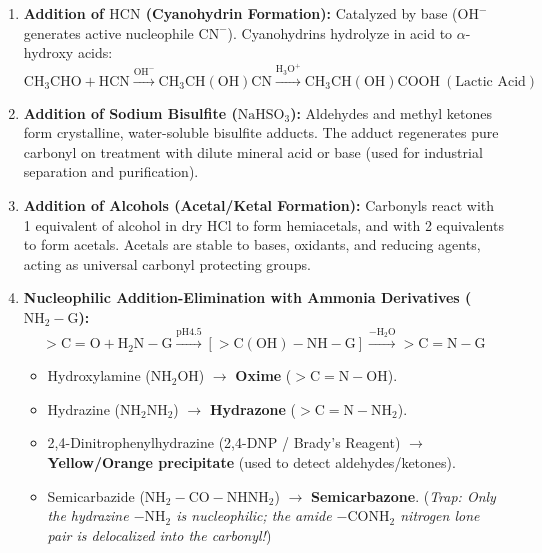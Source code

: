 \documentclass[10pt,a4paper]{article}
\begin{document}
\begin{usecasebox}
\begin{enumerate}[leftmargin=*]
  \item \textbf{Addition of $\mathrm{HCN}$ (Cyanohydrin Formation):} Catalyzed by base ($\mathrm{OH^-}$ generates active nucleophile $\mathrm{CN^-}$). Cyanohydrins hydrolyze in acid to $\alpha$-hydroxy acids:
  \begin{equation}
    \mathrm{CH_3CHO} + \mathrm{HCN} \xrightarrow{\mathrm{OH^-}} \mathrm{CH_3CH(OH)CN} \xrightarrow{\mathrm{H_3O^+}} \mathrm{CH_3CH(OH)COOH} \ (\text{Lactic Acid})
  \end{equation}
  \item \textbf{Addition of Sodium Bisulfite ($\mathrm{NaHSO_3}$):} Aldehydes and methyl ketones form crystalline, water-soluble bisulfite adducts. The adduct regenerates pure carbonyl on treatment with dilute mineral acid or base (used for industrial separation and purification).
  \item \textbf{Addition of Alcohols (Acetal/Ketal Formation):} Carbonyls react with 1 equivalent of alcohol in dry $\mathrm{HCl}$ to form hemiacetals, and with 2 equivalents to form acetals. Acetals are stable to bases, oxidants, and reducing agents, acting as universal carbonyl protecting groups.
  \item \textbf{Nucleophilic Addition-Elimination with Ammonia Derivatives ($\mathrm{NH_2-G}$):}
  \begin{equation}
    >\mathrm{C=O} + \mathrm{H_2N-G} \xrightarrow{\mathrm{pH } 4.5} [>\mathrm{C(OH)-NH-G}] \xrightarrow{-\mathrm{H_2O}} >\mathbf{\mathrm{C=N-G}}
  \end{equation}
  \begin{itemize}
    \item Hydroxylamine ($\mathrm{NH_2OH}$) $\to$ \textbf{Oxime} ($>\mathrm{C=N-OH}$).
    \item Hydrazine ($\mathrm{NH_2NH_2}$) $\to$ \textbf{Hydrazone} ($>\mathrm{C=N-NH_2}$).
    \item 2,4-Dinitrophenylhydrazine (2,4-DNP / Brady's Reagent) $\to$ \textbf{Yellow/Orange precipitate} (used to detect aldehydes/ketones).
    \item Semicarbazide ($\mathrm{NH_2-CO-NHNH_2}$) $\to$ \textbf{Semicarbazone}. (\textit{Trap: Only the hydrazine $-\mathrm{NH_2}$ is nucleophilic; the amide $-\mathrm{CONH_2}$ nitrogen lone pair is delocalized into the carbonyl!})
  \end{itemize}
\end{enumerate}
\end{usecasebox}
\end{document}
